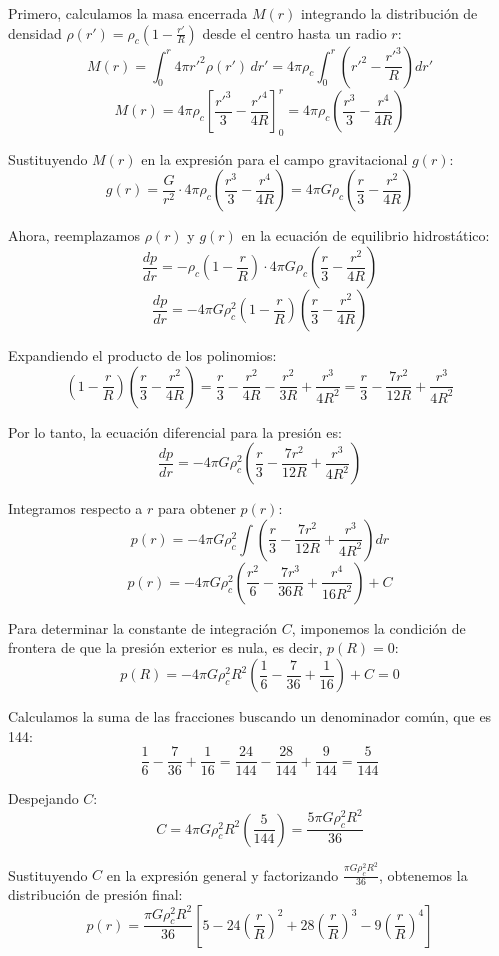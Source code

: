 \documentclass[12pt]{article}
\begin{document}
\begin{enumerate}
Primero, calculamos la masa encerrada $M(r)$ integrando la distribución de densidad $\rho(r') = \rho_c \left(1 - \frac{r'}{R}\right)$ desde el centro hasta un radio $r$:
$$
M(r) = \int_0^r 4\pi r'^2 \rho(r') \, dr' = 4\pi \rho_c \int_0^r \left(r'^2 - \frac{r'^3}{R}\right) dr'
$$
$$
M(r) = 4\pi \rho_c \left[ \frac{r'^3}{3} - \frac{r'^4}{4R} \right]_0^r = 4\pi \rho_c \left( \frac{r^3}{3} - \frac{r^4}{4R} \right)
$$

Sustituyendo $M(r)$ en la expresión para el campo gravitacional $g(r)$:
$$
g(r) = \frac{G}{r^2} \cdot 4\pi \rho_c \left( \frac{r^3}{3} - \frac{r^4}{4R} \right) = 4\pi G \rho_c \left( \frac{r}{3} - \frac{r^2}{4R} \right)
$$

Ahora, reemplazamos $\rho(r)$ y $g(r)$ en la ecuación de equilibrio hidrostático:
$$
\frac{dp}{dr} = -\rho_c \left(1 - \frac{r}{R}\right) \cdot 4\pi G \rho_c \left( \frac{r}{3} - \frac{r^2}{4R} \right)
$$
$$
\frac{dp}{dr} = -4\pi G \rho_c^2 \left(1 - \frac{r}{R}\right) \left( \frac{r}{3} - \frac{r^2}{4R} \right)
$$

Expandiendo el producto de los polinomios:
$$
\left(1 - \frac{r}{R}\right) \left( \frac{r}{3} - \frac{r^2}{4R} \right) = \frac{r}{3} - \frac{r^2}{4R} - \frac{r^2}{3R} + \frac{r^3}{4R^2} = \frac{r}{3} - \frac{7r^2}{12R} + \frac{r^3}{4R^2}
$$

Por lo tanto, la ecuación diferencial para la presión es:
$$
\frac{dp}{dr} = -4\pi G \rho_c^2 \left( \frac{r}{3} - \frac{7r^2}{12R} + \frac{r^3}{4R^2} \right)
$$

Integramos respecto a $r$ para obtener $p(r)$:
$$
p(r) = -4\pi G \rho_c^2 \int \left( \frac{r}{3} - \frac{7r^2}{12R} + \frac{r^3}{4R^2} \right) dr
$$
$$
p(r) = -4\pi G \rho_c^2 \left( \frac{r^2}{6} - \frac{7r^3}{36R} + \frac{r^4}{16R^2} \right) + C
$$

Para determinar la constante de integración $C$, imponemos la condición de frontera de que la presión exterior es nula, es decir, $p(R) = 0$:
$$
p(R) = -4\pi G \rho_c^2 R^2 \left( \frac{1}{6} - \frac{7}{36} + \frac{1}{16} \right) + C = 0
$$

Calculamos la suma de las fracciones buscando un denominador común, que es 144:
$$
\frac{1}{6} - \frac{7}{36} + \frac{1}{16} = \frac{24}{144} - \frac{28}{144} + \frac{9}{144} = \frac{5}{144}
$$

Despejando $C$:
$$
C = 4\pi G \rho_c^2 R^2 \left( \frac{5}{144} \right) = \frac{5\pi G \rho_c^2 R^2}{36}
$$

Sustituyendo $C$ en la expresión general y factorizando $\frac{\pi G \rho_c^2 R^2}{36}$, obtenemos la distribución de presión final:
$$
p(r) = \frac{\pi G \rho_c^2 R^2}{36} \left[ 5 - 24\left(\frac{r}{R}\right)^2 + 28\left(\frac{r}{R}\right)^3 - 9\left(\frac{r}{R}\right)^4 \right]
$$


\end{enumerate}
\end{document}
